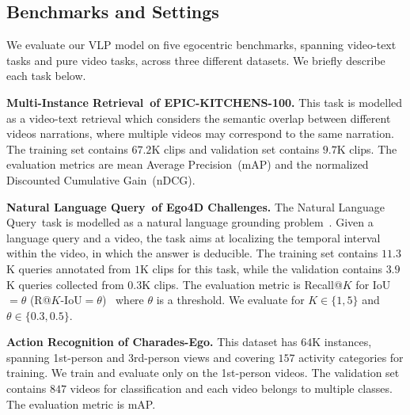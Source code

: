 \documentclass{article}
\newcommand{\epic}{EPIC-KITCHENS-100}
\newcommand{\mir}{Multi-Instance Retrieval}
\newcommand{\nlq}{Natural Language Query}
\begin{document}
\begin{comment}
\begin{table}[h]
	\centering
	\scriptsize
	\begin{threeparttable}
		\begin{tabular}{lcccclc}
			\toprule[1pt] 
			\textbf{Benchmarks} &  \textbf{Tasks} & \textbf{V-L or V} & \textbf{Datasets} &   \textbf{\# Train} & \textbf{Train~/~FT Data} & \textbf{mAP~(\%)}  \\ \midrule[1pt] 
			\bottomrule[1pt] 
		\end{tabular}
	\end{threeparttable}
	\label{dataset}
	\caption{Performance of the Charades-Ego dataset (1st-person test set).}
\end{table}
\end{comment}

\subsection{Benchmarks and Settings}\label{e1}
We evaluate our VLP model on five egocentric benchmarks, spanning video-text tasks and pure video tasks, across three different datasets. We briefly describe each task below.

\textbf{\mir~of \epic.} 
This task is modelled as a video-text retrieval which considers the semantic overlap between different videos narrations, where multiple videos may correspond to the same narration. 
The training set contains $67.2$K clips and validation set contains $9.7$K clips. 
The evaluation metrics are mean Average Precision~(mAP) and the normalized Discounted Cumulative Gain~(nDCG).

\textbf{\nlq~of Ego4D Challenges.} 
The \nlq~task is modelled as a natural language grounding problem~\cite{hendricks2018localizing,Gao_2017_ICCV,soldan2021vlg}. 
Given a language query and a video, the task aims at localizing the temporal interval within the video, in which the answer is deducible. 
The training set contains $11.3$K queries annotated from $1$K clips for this task, while the validation contains $3.9$K queries collected from $0.3$K clips. 
The evaluation metric is Recall@$K$ for IoU${=}\theta$ (R@$K$-IoU${=}\theta$)~\cite{hendricks2018localizing} where $\theta$ is a threshold.
We evaluate for $K{\in}\{1,5\}$ and $\theta{\in}\{0.3,0.5\}$.

\textbf{Action Recognition of Charades-Ego.}
This dataset has $64$K instances, spanning 1st-person and 3rd-person views and covering $157$ activity categories for training. We train and evaluate only on the 1st-person videos. 
The validation set contains $847$ videos for classification and each video belongs to multiple classes. 
The evaluation metric is mAP. 
\end{document}
